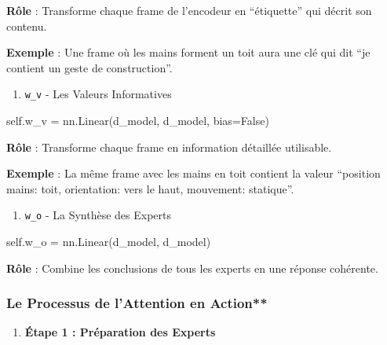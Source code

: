 \documentclass[12pt]{article}
\providecommand{\tightlist}{%
      \setlength{\itemsep}{0pt}\setlength{\parskip}{0pt}}
\newenvironment{Shaded}{}{}
\newcommand{\NormalTok}[1]{{#1}}
\newcommand{\VariableTok}[1]{\textcolor[rgb]{0.10,0.09,0.49}{{#1}}}
\newcommand{\OperatorTok}[1]{\textcolor[rgb]{0.40,0.40,0.40}{{#1}}}
\begin{document}
\textbf{Rôle} : Transforme chaque frame de l'encodeur en ``étiquette''
qui décrit son contenu.

\textbf{Exemple} : Une frame où les mains forment un toit aura une clé
qui dit ``je contient un geste de construction''.

\begin{enumerate}
\def\labelenumi{\arabic{enumi}.}
\setcounter{enumi}{2}
\tightlist
\item
  \texttt{w\_v} - Les Valeurs Informatives
\end{enumerate}

\begin{Shaded}
\begin{Highlighting}[]
\VariableTok{self}\NormalTok{.w\_v }\OperatorTok{=}\NormalTok{ nn.Linear(d\_model, d\_model, bias}\OperatorTok{=}\VariableTok{False}\NormalTok{)}
\end{Highlighting}
\end{Shaded}

\textbf{Rôle} : Transforme chaque frame en information détaillée
utilisable.

\textbf{Exemple} : La même frame avec les mains en toit contient la
valeur ``position mains: toit, orientation: vers le haut, mouvement:
statique''.

\begin{enumerate}
\def\labelenumi{\arabic{enumi}.}
\setcounter{enumi}{3}
\tightlist
\item
  \texttt{w\_o} - La Synthèse des Experts
\end{enumerate}

\begin{Shaded}
\begin{Highlighting}[]
\VariableTok{self}\NormalTok{.w\_o }\OperatorTok{=}\NormalTok{ nn.Linear(d\_model, d\_model)}
\end{Highlighting}
\end{Shaded}

\textbf{Rôle} : Combine les conclusions de tous les experts en une
réponse cohérente.

    \subsubsection{Le Processus de l'Attention en
Action**}\label{le-processus-de-lattention-en-action}

\begin{enumerate}
\def\labelenumi{\arabic{enumi}.}
\tightlist
\item
  \textbf{Étape 1 : Préparation des Experts}
\end{enumerate}
\end{document}
